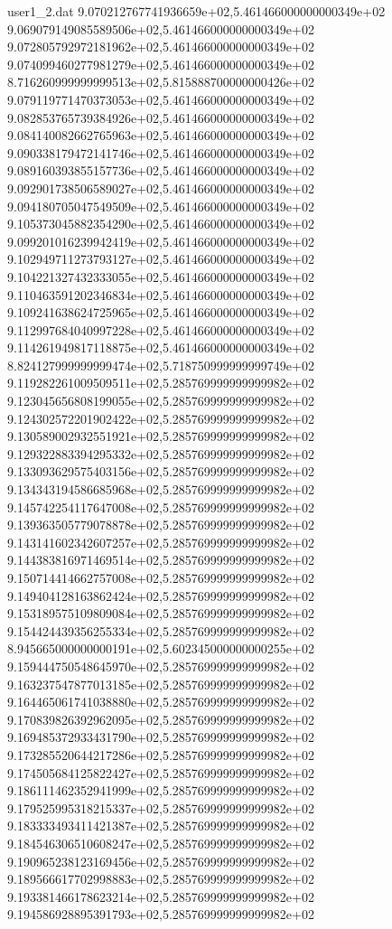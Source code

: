 \begin{filecontents}{user1_2.dat}
9.070212767741936659e+02,5.461466000000000349e+02
9.069079149085589506e+02,5.461466000000000349e+02
9.072805792972181962e+02,5.461466000000000349e+02
9.074099460277981279e+02,5.461466000000000349e+02
8.716260999999999513e+02,5.815888700000000426e+02
9.079119771470373053e+02,5.461466000000000349e+02
9.082853765739384926e+02,5.461466000000000349e+02
9.084140082662765963e+02,5.461466000000000349e+02
9.090338179472141746e+02,5.461466000000000349e+02
9.089160393855157736e+02,5.461466000000000349e+02
9.092901738506589027e+02,5.461466000000000349e+02
9.094180705047549509e+02,5.461466000000000349e+02
9.105373045882354290e+02,5.461466000000000349e+02
9.099201016239942419e+02,5.461466000000000349e+02
9.102949711273793127e+02,5.461466000000000349e+02
9.104221327432333055e+02,5.461466000000000349e+02
9.110463591202346834e+02,5.461466000000000349e+02
9.109241638624725965e+02,5.461466000000000349e+02
9.112997684040997228e+02,5.461466000000000349e+02
9.114261949817118875e+02,5.461466000000000349e+02
8.824127999999999474e+02,5.718750999999999749e+02
9.119282261009509511e+02,5.285769999999999982e+02
9.123045656808199055e+02,5.285769999999999982e+02
9.124302572201902422e+02,5.285769999999999982e+02
9.130589002932551921e+02,5.285769999999999982e+02
9.129322883394295332e+02,5.285769999999999982e+02
9.133093629575403156e+02,5.285769999999999982e+02
9.134343194586685968e+02,5.285769999999999982e+02
9.145742254117647008e+02,5.285769999999999982e+02
9.139363505779078878e+02,5.285769999999999982e+02
9.143141602342607257e+02,5.285769999999999982e+02
9.144383816971469514e+02,5.285769999999999982e+02
9.150714414662757008e+02,5.285769999999999982e+02
9.149404128163862424e+02,5.285769999999999982e+02
9.153189575109809084e+02,5.285769999999999982e+02
9.154424439356255334e+02,5.285769999999999982e+02
8.945665000000000191e+02,5.602345000000000255e+02
9.159444750548645970e+02,5.285769999999999982e+02
9.163237547877013185e+02,5.285769999999999982e+02
9.164465061741038880e+02,5.285769999999999982e+02
9.170839826392962095e+02,5.285769999999999982e+02
9.169485372933431790e+02,5.285769999999999982e+02
9.173285520644217286e+02,5.285769999999999982e+02
9.174505684125822427e+02,5.285769999999999982e+02
9.186111462352941999e+02,5.285769999999999982e+02
9.179525995318215337e+02,5.285769999999999982e+02
9.183333493411421387e+02,5.285769999999999982e+02
9.184546306510608247e+02,5.285769999999999982e+02
9.190965238123169456e+02,5.285769999999999982e+02
9.189566617702998883e+02,5.285769999999999982e+02
9.193381466178623214e+02,5.285769999999999982e+02
9.194586928895391793e+02,5.285769999999999982e+02

\end{filecontents}
